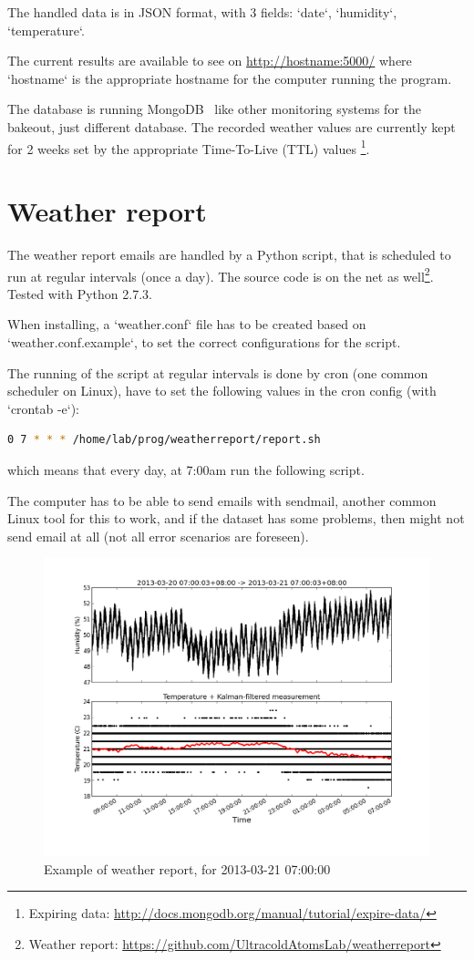 \documentclass[12pt,a4paper]{article}
\begin{document}
The handled data is in JSON format, with 3 fields: `date`, `humidity`, `temperature`.

The current results are available to see on \url{http://hostname:5000/} where `hostname` is the appropriate hostname for the computer running the program.

The database is running MongoDB \, like other monitoring systems for the bakeout, just different database. The recorded weather values are currently kept for 2 weeks set by the appropriate Time-To-Live (TTL) values \footnote{Expiring data: \url{http://docs.mongodb.org/manual/tutorial/expire-data/}}.

\section{Weather report}

The weather report emails are handled by a Python script, that is scheduled to run at regular intervals (once a day). The source code is on the net as well\footnote{Weather report: \url{https://github.com/UltracoldAtomsLab/weatherreport}}. Tested with Python 2.7.3.

When installing, a `weather.conf` file has to be created based on `weather.conf.example`, to set the correct configurations for the script.

The running of the script at regular intervals is done by cron (one common scheduler on Linux), have to set the following values in the cron config (with `crontab -e`):
\begin{lstlisting}[language=Bash,frame=single]
0 7 * * * /home/lab/prog/weatherreport/report.sh
\end{lstlisting}
which means that every day, at 7:00am run the following script.

The computer has to be able to send emails with sendmail, another common Linux tool for this to work, and if the dataset has some problems, then might not send email at all (not all error scenarios are foreseen).

\begin{figure}[ht!]
\centering
\includegraphics[width=140mm]{20130321-0700.png}
\caption{Example of weather report, for 2013-03-21 07:00:00}
\label{fig:weatherreport}
\end{figure}
\end{document}
